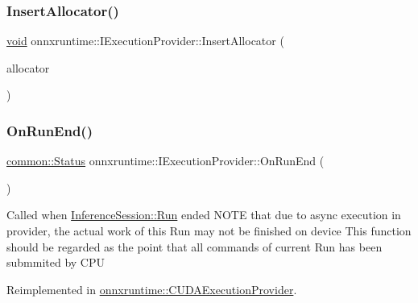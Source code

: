 \mbox{\label{classonnxruntime_1_1IExecutionProvider_a625943e29574b9876f3d7c34e3fe882e}} 
\subsubsection{\texorpdfstring{Insert\+Allocator()}{InsertAllocator()}}
{\footnotesize\ttfamily \mbox{\hyperlink{mlasi_8h_a88f941d423cb2a819b70a1358982b1a6}{void}} onnxruntime\+::\+I\+Execution\+Provider\+::\+Insert\+Allocator (\begin{DoxyParamCaption}\item[{\mbox{\hyperlink{namespaceonnxruntime_a6cdac724c5dcefded3a63f08dae58fda}{Allocator\+Ptr}}}]{allocator }\end{DoxyParamCaption})}

\mbox{\label{classonnxruntime_1_1IExecutionProvider_a2a4b49018ff2509a01c1dd73b5cbb811}} 
\subsubsection{\texorpdfstring{On\+Run\+End()}{OnRunEnd()}}
{\footnotesize\ttfamily \mbox{\hyperlink{classonnxruntime_1_1common_1_1Status}{common\+::\+Status}} onnxruntime\+::\+I\+Execution\+Provider\+::\+On\+Run\+End (\begin{DoxyParamCaption}{ }\end{DoxyParamCaption})\hspace{0.3cm}{\ttfamily [virtual]}}

Called when \mbox{\hyperlink{classonnxruntime_1_1InferenceSession_a90aa8b5fdc2638c4d2c45afc9c3ed222}{Inference\+Session\+::\+Run}} ended N\+O\+TE that due to async execution in provider, the actual work of this Run may not be finished on device This function should be regarded as the point that all commands of current Run has been submmited by C\+PU 

Reimplemented in \mbox{\hyperlink{classonnxruntime_1_1CUDAExecutionProvider_aad4464387bb09d2337e334d5a7325e5d}{onnxruntime\+::\+C\+U\+D\+A\+Execution\+Provider}}.

